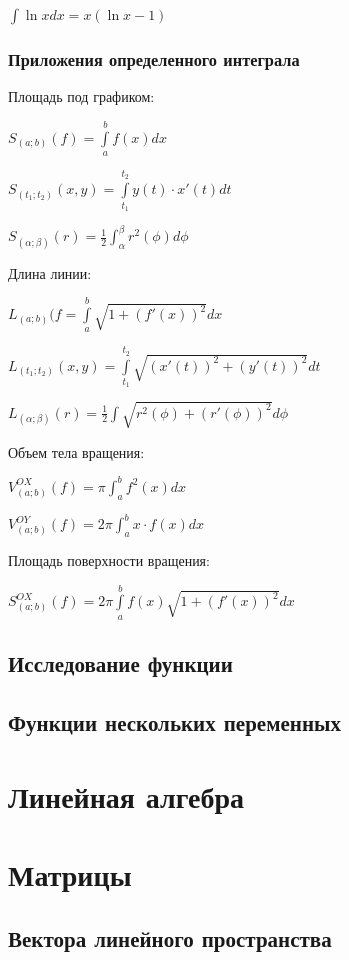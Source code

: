 $ \int \ln x dx = x(\ln x -1) $

\subsubsection{Приложения определенного интеграла}

Площадь под графиком:

$ S_{(a; b)}(f) = \int\limits_a^b f(x) dx $

$ S_{(t_1; t_2)}(x, y) = \int\limits_{t_1}^{t_2} y(t)\cdot x'(t) dt $ 

$ S_{(\alpha; \beta)}(r) = \frac{1}{2} \int_\alpha^\beta r^2(\phi) d\phi $

Длина линии:

$ L_{(a;b)}(f = \int\limits_a^b \sqrt{1+(f'(x))^2} dx $

$ L_{(t_1; t_2)}(x, y) = \int\limits_{t_1}^{t_2} \sqrt{(x'(t))^2+(y'(t))^2} dt $

$ L_{(\alpha; \beta)}(r) = \frac{1}{2} \int \sqrt{r^2(\phi) + (r'(\phi))^2} d\phi $

Объем тела вращения:

$ V^{OX}_{(a; b)}(f) = \pi \int_a^b f^2(x) dx $

$ V^{OY}_{(a; b)}(f) = 2\pi \int_a^b x\cdot f(x) dx $

Площадь поверхности вращения:

$ S^{OX}_{(a;b)}(f) = 2\pi \int\limits_a^b f(x)\sqrt{1+(f'(x))^2} dx $

\subsection{Исследование функции}

\subsection{Функции нескольких переменных}


\section{Линейная алгебра}

\section{Матрицы}

\subsection{Вектора линейного пространства}

